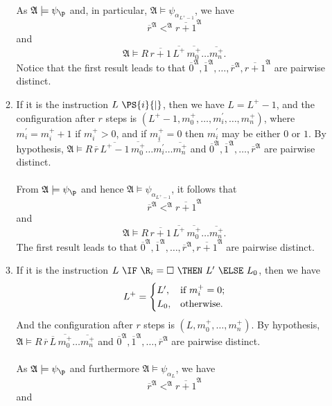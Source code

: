 \begin{enumerate}[1.]
\begin{enumerate}[1)]
\ \\
As $\mathfrak{A} \models \psi_\p$ and, in particular, $\mathfrak{A} \models \psi_{\alpha_{L^+ - 1}}$, we have
\[
\overline{r}^\mathfrak{A} <^\mathfrak{A} \overline{r + 1}^\mathfrak{A}
\]
and
\[
\mathfrak{A} \models R \, \overline{r + 1} \, \overline{L^+} \, \overline{m_0^+} \ldots \overline{m_n^+}.
\]
Notice that the first result leads to that $\overline{0}^\mathfrak{A}, \overline{1}^\mathfrak{A}, \ldots, \overline{r}^\mathfrak{A}, \overline{r + 1}^\mathfrak{A}$ are pairwise distinct.
\item If it is the instruction $L \ \PS{i}{|}$, then we have $L = L^+ - 1$, and the configuration after $r$ steps is $(L^+ - 1, m_0^+, \ldots, m_i^\prime, \ldots, m_n^+)$, where $m_i^\prime = m_i^+ + 1$ if $m_i^+ > 0$, and if $m_i^+ = 0$ then $m_i^\prime$ may be either $0$ or $1$. By hypothesis, $\mathfrak{A} \models R \, \overline{r} \, \overline{L^+ - 1} \, \overline{m_0^+} \ldots \overline{m_i^\prime} \ldots \overline{m_n^+}$ and $\overline{0}^\mathfrak{A}, \overline{1}^\mathfrak{A}, \ldots, \overline{r}^\mathfrak{A}$ are pairwise distinct.\\
\ \\
From $\mathfrak{A} \models \psi_\p$ and hence $\mathfrak{A} \models \psi_{\alpha_{L^+ - 1}}$, it follows that
\[
\overline{r}^\mathfrak{A} <^\mathfrak{A} \overline{r + 1}^\mathfrak{A}
\]
and
\[
\mathfrak{A} \models R \, \overline{r + 1} \, \overline{L^+} \, \overline{m_0^+} \ldots \overline{m_n^+}.
\]
The first result leads to that $\overline{0}^\mathfrak{A}, \overline{1}^\mathfrak{A}, \ldots, \overline{r}^\mathfrak{A}, \overline{r + 1}^\mathfrak{A}$ are pairwise distinct.
\item If it is the instruction $L \ \IF \ \R_i = \Box \ \THEN \ L^\prime \ \ELSE \ L_0$, then we have
\[
L^+ = \begin{cases}
L^\prime,  & \mbox{if \(m_i^+ = 0\)}; \cr
L_0,       & \mbox{otherwise}.
\end{cases}
\]
And the configuration after $r$ steps is $(L, m_0^+, \ldots, m_n^+)$. By hypothesis, $\mathfrak{A} \models R \, \overline{r} \, \overline{L} \, \overline{m_0^+} \ldots \overline{m_n^+}$ and $\overline{0}^\mathfrak{A}, \overline{1}^\mathfrak{A}, \ldots, \overline{r}^\mathfrak{A}$ are pairwise distinct.\\
\ \\
As $\mathfrak{A} \models \psi_\p$ and furthermore $\mathfrak{A} \models \psi_{\alpha_L}$, we have
\[
\overline{r}^\mathfrak{A} <^\mathfrak{A} \overline{r + 1}^\mathfrak{A}
\]
and
\[
\]
\end{enumerate}
\end{enumerate}
